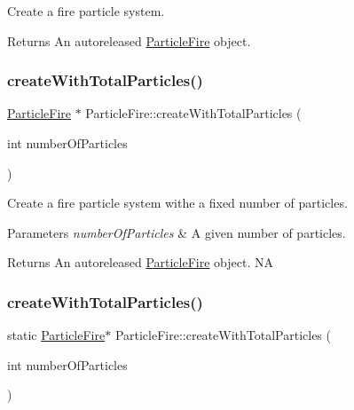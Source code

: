 Create a fire particle system.

\begin{DoxyReturn}{Returns}
An autoreleased \hyperlink{classParticleFire}{Particle\+Fire} object. 
\end{DoxyReturn}
\mbox{\label{classParticleFire_a67b0a6ab2d86159484c6bd1e0f0f512a}} 
\subsubsection{\texorpdfstring{create\+With\+Total\+Particles()}{createWithTotalParticles()}\hspace{0.1cm}{\footnotesize\ttfamily [1/2]}}
{\footnotesize\ttfamily \hyperlink{classParticleFire}{Particle\+Fire} $\ast$ Particle\+Fire\+::create\+With\+Total\+Particles (\begin{DoxyParamCaption}\item[{int}]{number\+Of\+Particles }\end{DoxyParamCaption})\hspace{0.3cm}{\ttfamily [static]}}

Create a fire particle system withe a fixed number of particles.


\begin{DoxyParams}{Parameters}
{\em number\+Of\+Particles} & A given number of particles. \\
\hline
\end{DoxyParams}
\begin{DoxyReturn}{Returns}
An autoreleased \hyperlink{classParticleFire}{Particle\+Fire} object.  NA 
\end{DoxyReturn}
\mbox{\label{classParticleFire_a574a4c7817439eb7fee4f1f0ed064edb}} 
\subsubsection{\texorpdfstring{create\+With\+Total\+Particles()}{createWithTotalParticles()}\hspace{0.1cm}{\footnotesize\ttfamily [2/2]}}
{\footnotesize\ttfamily static \hyperlink{classParticleFire}{Particle\+Fire}$\ast$ Particle\+Fire\+::create\+With\+Total\+Particles (\begin{DoxyParamCaption}\item[{int}]{number\+Of\+Particles }\end{DoxyParamCaption})\hspace{0.3cm}{\ttfamily [static]}}

